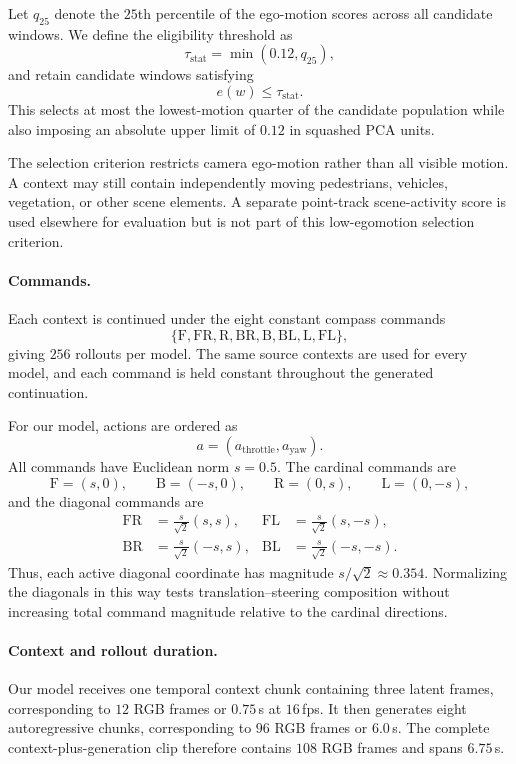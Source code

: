\documentclass[letterpaper]{article} %
\begin{document}
Let $q_{25}$ denote the $25$th percentile of the ego-motion scores across all
candidate windows. We define the eligibility threshold as
\[
\tau_{\mathrm{stat}}
=
\min(0.12,q_{25}),
\]
and retain candidate windows satisfying
\[
e(w)\leq\tau_{\mathrm{stat}}.
\]
This selects at most the lowest-motion quarter of the candidate population
while also imposing an absolute upper limit of $0.12$ in squashed PCA units.

The selection criterion restricts camera ego-motion rather than all visible
motion. A context may still contain independently moving pedestrians,
vehicles, vegetation, or other scene elements. A separate point-track
scene-activity score is used elsewhere for evaluation but is not part of
this low-egomotion selection criterion.

\paragraph{Commands.}
Each context is continued under the eight constant compass commands
\[
\{
\mathrm{F},\mathrm{FR},\mathrm{R},\mathrm{BR},
\mathrm{B},\mathrm{BL},\mathrm{L},\mathrm{FL}
\},
\]
giving $256$ rollouts per model. The same source contexts are used for every
model, and each command is held constant throughout the generated
continuation.

For our model, actions are ordered as
\[
a=(a_{\mathrm{throttle}},a_{\mathrm{yaw}}).
\]
All commands have Euclidean norm $s=0.5$. The cardinal commands are
\[
\mathrm{F}=(s,0),\qquad
\mathrm{B}=(-s,0),\qquad
\mathrm{R}=(0,s),\qquad
\mathrm{L}=(0,-s),
\]
and the diagonal commands are
\[
\begin{aligned}
\mathrm{FR}&=\frac{s}{\sqrt{2}}(s,s),&
\mathrm{FL}&=\frac{s}{\sqrt{2}}(s,-s),\\
\mathrm{BR}&=\frac{s}{\sqrt{2}}(-s,s),&
\mathrm{BL}&=\frac{s}{\sqrt{2}}(-s,-s).
\end{aligned}
\]
Thus, each active diagonal coordinate has magnitude
$s/\sqrt{2}\approx0.354$. Normalizing the diagonals in this way tests
translation--steering composition without increasing total command magnitude
relative to the cardinal directions.

\paragraph{Context and rollout duration.}
Our model receives one temporal context chunk containing three latent frames,
corresponding to $12$ RGB frames or $0.75$\,s at $16$\,fps. It then generates
eight autoregressive chunks, corresponding to $96$ RGB frames or $6.0$\,s.
The complete context-plus-generation clip therefore contains $108$ RGB frames
and spans $6.75$\,s.
\end{document}
